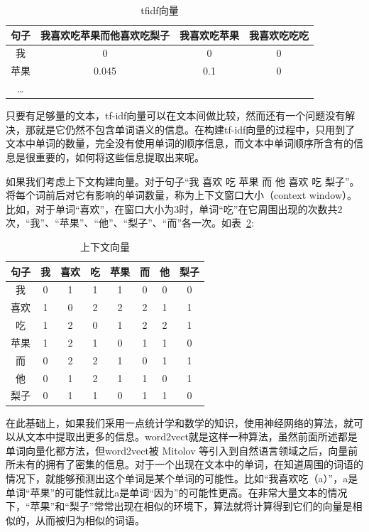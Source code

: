\begin{table}[!htbp]
\caption{tfidf向量}
\label{table:tfidf-vec}
\centering
\begin{tabular}{|c|c|c|c|}
\hline
句子 & 我喜欢吃苹果而他喜欢吃梨子 & 我喜欢吃苹果 & 我喜欢吃吃吃  \\
\hline
我 & 0 & 0 & 0  \\
\hline
苹果 & 0.045 & 0.1 & 0 \\
\hline
… &  &  &  \\
\hline
\end{tabular}
\end{table}

只要有足够量的文本，tf-idf向量可以在文本间做比较，然而还有一个问题没有解决，那就是它仍然不包含单词语义的信息。在构建tf-idf向量的过程中，只用到了文本中单词的数量，完全没有使用单词的顺序信息，而文本中单词顺序所含有的信息是很重要的，如何将这些信息提取出来呢。

如果我们考虑上下文构建向量。对于句子“我 喜欢 吃 苹果 而 他 喜欢 吃 梨子”。将每个词前后对它有影响的单词数量，称为上下文窗口大小（context window）。比如，对于单词“喜欢”，在窗口大小为3时，单词“吃”在它周围出现的次数共2次，“我”、“苹果”、“他”、“梨子”、“而”各一次。如表~\ref{table:context}:

\begin{table}[!htbp]
\caption{上下文向量}
\label{table:context}
\centering
\begin{tabular}{|c|c|c|c|c|c|c|c|}
\hline
句子 & 我 & 喜欢 & 吃 & 苹果 & 而 & 他 & 梨子 \\
\hline
我   & 0 & 1 & 1 & 1 & 0 & 0 & 0 \\
\hline
喜欢 & 1 & 0 & 2 & 2 & 2 & 1 & 1 \\
\hline
吃   & 1 & 2 & 0 & 1 & 2 & 2 & 1 \\
\hline
苹果 & 1 & 2 & 1 & 0 & 1 & 1 & 0 \\
\hline
而   & 0 & 2 & 2 & 1 & 0 & 1 & 1 \\
\hline
他   & 0 & 1 & 2 & 1 & 1 & 0 & 1 \\
\hline
梨子 & 0 & 1 & 1 & 0 & 1 & 1 & 0 \\
\hline
\end{tabular}
\end{table}

在此基础上，如果我们采用一点统计学和数学的知识，使用神经网络的算法，就可以从文本中提取出更多的信息。word2vect就是这样一种算法，虽然前面所述都是单词向量化都方法，但word2vect被 Mitolov 等引入到自然语言领域之后，向量前所未有的拥有了密集的信息。对于一个出现在文本中的单词，在知道周围的词语的情况下，就能够预测出这个单词是某个单词的可能性。\cite{baroni2014don}比如“我喜欢吃（a）”，a是单词“苹果”的可能性就比a是单词“因为”的可能性更高。在非常大量文本的情况下，“苹果”和“梨子”常常出现在相似的环境下，算法就将计算得到它们的向量是相似的，从而被归为相似的词语。\cite{DBLP:journals/corr/abs-1301-3781}

